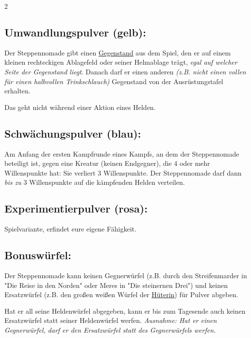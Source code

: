\documentclass[10pt, a4paper, oneside]{book}
\newcommand{\fan}[1]{\textit{#1}}
\begin{document}
\begin{multicols*}{2}
\begin{nobgcolor}
\subsection{Umwandlungspulver (gelb):}

Der Steppennomade gibt einen \hyperref[gegenstaende-und-sonderplaettchen]{Gegenstand} aus dem Spiel, den er auf einem kleinen rechteckigen Ablagefeld oder seiner Helmablage trägt, \fan{egal auf welcher Seite der Gegenstand liegt}. Danach darf er einen anderen \fan{(z.B. nicht einen vollen für einen halbvollen Trinkschlauch)} Gegenstand von der Ausrüstungstafel erhalten. 
\supercite{mh-pulver}

Das geht nicht während einer Aktion eines Helden.
\supercite{88552}




\subsection{Schwächungspulver (blau):}

Am Anfang der ersten Kampfrunde eines Kampfs, an dem der Steppennomade beteiligt ist, gegen eine Kreatur (keinen Endgegner\supercite{89624,90008}), die 4 oder mehr Willenspunkte hat\supercite{88552,89625}: Sie verliert 3 Willenspunkte. Der Steppennomade darf dann \fan{bis zu} 3 Willenspunkte auf die kämpfenden Helden verteilen. 
\supercite{mh-pulver}






\subsection{Experimentierpulver (rosa):}

Spielvariante, erfindet eure eigene Fähigkeit.
\supercite{mh-steppennomade,mh-pulver,mh-begleitheft}




\subsection{Bonuswürfel:}

Der Steppennomade kann keinen Gegnerwürfel (z.B. durch den Streifenmarder in "Die Reise in den Norden" oder Meres in "Die steinernen Drei") und keinen Ersatzwürfel (z.B. den großen weißen Würfel der \hyperref[hueterin]{Hüterin}) für Pulver abgeben.

Hat er all seine Heldenwürfel abgegeben, kann er bis zum Tagesende auch keinen Ersatzwürfel statt seiner Heldenwürfel werfen.
\supercite{94520} 
\fan{Ausnahme: Hat er einen Gegnerwürfel, darf er den Ersatzwürfel statt des Gegnerwürfels werfen.}








\end{nobgcolor}
\end{multicols*}
\end{document}

